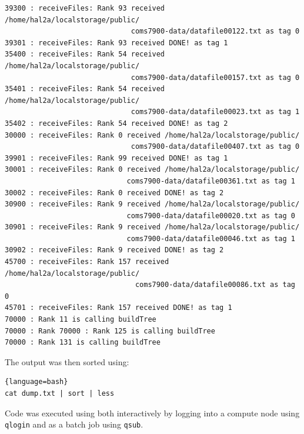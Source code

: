 \documentclass{article}
\begin{document}
\begin{mdframed}[backgroundcolor=blue!20]
	\setlength\itemsep{0.1pt}
	\setlength\parskip{0.1pt}
	\begin{verbatim}
39300 : receiveFiles: Rank 93 received /home/hal2a/localstorage/public/
                              coms7900-data/datafile00122.txt as tag 0
39301 : receiveFiles: Rank 93 received DONE! as tag 1
35400 : receiveFiles: Rank 54 received /home/hal2a/localstorage/public/
                              coms7900-data/datafile00157.txt as tag 0
35401 : receiveFiles: Rank 54 received /home/hal2a/localstorage/public/
                              coms7900-data/datafile00023.txt as tag 1
35402 : receiveFiles: Rank 54 received DONE! as tag 2
30000 : receiveFiles: Rank 0 received /home/hal2a/localstorage/public/
                              coms7900-data/datafile00407.txt as tag 0
39901 : receiveFiles: Rank 99 received DONE! as tag 1
30001 : receiveFiles: Rank 0 received /home/hal2a/localstorage/public/
                             coms7900-data/datafile00361.txt as tag 1
30002 : receiveFiles: Rank 0 received DONE! as tag 2
30900 : receiveFiles: Rank 9 received /home/hal2a/localstorage/public/
                             coms7900-data/datafile00020.txt as tag 0
30901 : receiveFiles: Rank 9 received /home/hal2a/localstorage/public/
                             coms7900-data/datafile00046.txt as tag 1
30902 : receiveFiles: Rank 9 received DONE! as tag 2
45700 : receiveFiles: Rank 157 received /home/hal2a/localstorage/public/
                               coms7900-data/datafile00086.txt as tag 0
45701 : receiveFiles: Rank 157 received DONE! as tag 1
70000 : Rank 11 is calling buildTree
70000 : Rank 70000 : Rank 125 is calling buildTree
70000 : Rank 131 is calling buildTree	
    \end{verbatim}
\end{mdframed}

The output was then sorted using:

\begin{lstlisting}{language=bash}
cat dump.txt | sort | less
\end{lstlisting}


Code was executed using both interactively by logging into a compute node using \texttt{qlogin} and as a batch job using \texttt{qsub}.

%
%
\end{document}
